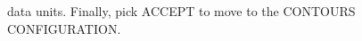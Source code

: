 \documentclass{article}
\begin{document}

data units. Finally, pick ACCEPT to move to the CONTOURS CONFIGURATION.


\end{document}
